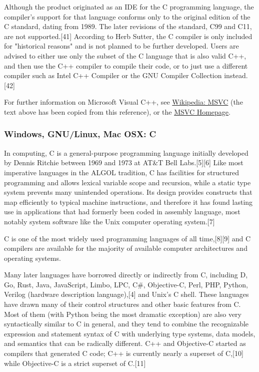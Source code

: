 \vpara
Although the product originated as an IDE for the C programming language, the compiler's support for that language conforms only to the original edition of the C standard, dating from 1989. The later revisions of the standard, C99 and C11, are not supported.[41] According to Herb Sutter, the C compiler is only included for "historical reasons" and is not planned to be further developed. Users are advised to either use only the subset of the C language that is also valid C++, and then use the C++ compiler to compile their code, or to just use a different compiler such as Intel C++ Compiler or the GNU Compiler Collection instead.[42]

\vpara
For further information on Microsoft Visual C++, see \href{http://en.wikipedia.org/wiki/Visual_C\%2B\%2B}{Wikipedia: MSVC} (the text above has been copied from this reference), or the  \href{http://msdn.microsoft.com/en-us/vstudio/hh386302}{MSVC Homepage}.

\newpage
\subsubsection{Windows, GNU/Linux, Mac OSX: C}
In computing, C is a general-purpose programming language initially developed by Dennis Ritchie between 1969 and 1973 at AT\&T Bell Labs.[5][6] Like most imperative languages in the ALGOL tradition, C has facilities for structured programming and allows lexical variable scope and recursion, while a static type system prevents many unintended operations. Its design provides constructs that map efficiently to typical machine instructions, and therefore it has found lasting use in applications that had formerly been coded in assembly language, most notably system software like the Unix computer operating system.[7]

\vpara
C is one of the most widely used programming languages of all time,[8][9] and C compilers are available for the majority of available computer architectures and operating systems.

\vpara
Many later languages have borrowed directly or indirectly from C, including D, Go, Rust, Java, JavaScript, Limbo, LPC, C\#, Objective-C, Perl, PHP, Python, Verilog (hardware description language),[4] and Unix's C shell. These languages have drawn many of their control structures and other basic features from C. Most of them (with Python being the most dramatic exception) are also very syntactically similar to C in general, and they tend to combine the recognizable expression and statement syntax of C with underlying type systems, data models, and semantics that can be radically different. C++ and Objective-C started as compilers that generated C code; C++ is currently nearly a superset of C,[10] while Objective-C is a strict superset of C.[11]

